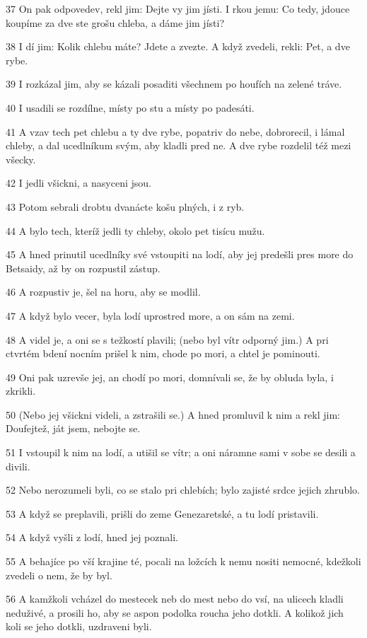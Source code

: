 \par 37 On pak odpovedev, rekl jim: Dejte vy jim jísti. I rkou jemu: Co tedy, jdouce koupíme za dve ste grošu chleba, a dáme jim jísti?
\par 38 I dí jim: Kolik chlebu máte? Jdete a zvezte. A když zvedeli, rekli: Pet, a dve rybe.
\par 39 I rozkázal jim, aby se kázali posaditi všechnem po houfích na zelené tráve.
\par 40 I usadili se rozdílne, místy po stu a místy po padesáti.
\par 41 A vzav tech pet chlebu a ty dve rybe, popatriv do nebe, dobrorecil, i lámal chleby, a dal ucedlníkum svým, aby kladli pred ne. A dve rybe rozdelil též mezi všecky.
\par 42 I jedli všickni, a nasyceni jsou.
\par 43 Potom sebrali drobtu dvanácte košu plných, i z ryb.
\par 44 A bylo tech, kteríž jedli ty chleby, okolo pet tisícu mužu.
\par 45 A hned prinutil ucedlníky své vstoupiti na lodí, aby jej predešli pres more do Betsaidy, až by on rozpustil zástup.
\par 46 A rozpustiv je, šel na horu, aby se modlil.
\par 47 A když bylo vecer, byla lodí uprostred more, a on sám na zemi.
\par 48 A videl je, a oni se s težkostí plavili; (nebo byl vítr odporný jim.) A pri ctvrtém bdení nocním prišel k nim, chode po mori, a chtel je pominouti.
\par 49 Oni pak uzrevše jej, an chodí po mori, domnívali se, že by obluda byla, i zkrikli.
\par 50 (Nebo jej všickni videli, a zstrašili se.) A hned promluvil k nim a rekl jim: Doufejtež, ját jsem, nebojte se.
\par 51 I vstoupil k nim na lodí, a utišil se vítr; a oni náramne sami v sobe se desili a divili.
\par 52 Nebo nerozumeli byli, co se stalo pri chlebích; bylo zajisté srdce jejich zhrublo.
\par 53 A když se preplavili, prišli do zeme Genezaretské, a tu lodí pristavili.
\par 54 A když vyšli z lodí, hned jej poznali.
\par 55 A behajíce po vší krajine té, pocali na ložcích k nemu nositi nemocné, kdežkoli zvedeli o nem, že by byl.
\par 56 A kamžkoli vcházel do mestecek neb do mest nebo do vsí, na ulicech kladli neduživé, a prosili ho, aby se aspon podolka roucha jeho dotkli. A kolikož jich koli se jeho dotkli, uzdraveni byli.

